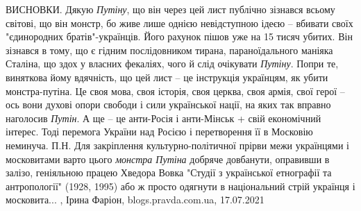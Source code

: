 ВИСНОВКИ.  Дякую \emph{Путіну}, що він через цей лист публічно зізнався всьому
світові, що він монстр, бо живе лише однією невідступною ідеєю – вбивати своїх
"єдинородних братів"-українців. Його рахунок пішов уже на 15 тисяч убитих. Він
зізнався в тому, що є гідним послідовником тирана, параноїдального маніяка
Сталіна, що здох у власних фекаліях, чого й слід очікувати \emph{Путіну}. Попри те,
виняткова йому вдячність, що цей лист – це інструкція українцям, як убити
монстра-путіна. Це своя мова, своя історія, своя церква, своя армія, свої герої
– ось вони духові опори свободи і сили української нації, на яких так вправно
наголосив \emph{Путін}. А ще – це анти-Росія і анти-Мінськ + свій економічний інтерес.
Тоді перемога України над Росією і перетворення її в Московію неминуча.  П.Н.
Для закріплення культурно-політичної прірви межи українцями і московитами варто
цього \emph{монстра Путіна} добряче довбанути, оправивши в залізо, геніяльною працею
Хведора Вовка "Студії з української етнографії та антропології" (1928, 1995)
або ж просто одягнути в національний стрій українця і московита...
, 
Ірина Фаріон, blogs.pravda.com.ua, 17.07.2021

